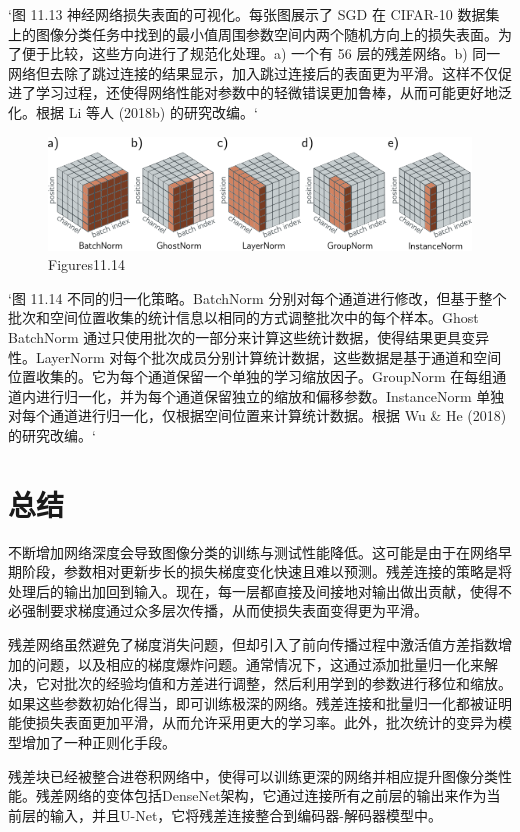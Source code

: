 `图 11.13 神经网络损失表面的可视化。每张图展示了 SGD 在 CIFAR-10 数据集上的图像分类任务中找到的最小值周围参数空间内两个随机方向上的损失表面。为了便于比较，这些方向进行了规范化处理。a) 一个有 56 层的残差网络。b) 同一网络但去除了跳过连接的结果显示，加入跳过连接后的表面更为平滑。这样不仅促进了学习过程，还使得网络性能对参数中的轻微错误更加鲁棒，从而可能更好地泛化。根据 Li 等人 (2018b) 的研究改编。`

\begin{figure}[h!]
\centering
\includegraphics[width=0.7\linewidth]{png/chapter11/ResidualNormTypes.png}
\caption{Figures11.14}
\end{figure}

`图 11.14 不同的归一化策略。BatchNorm 分别对每个通道进行修改，但基于整个批次和空间位置收集的统计信息以相同的方式调整批次中的每个样本。Ghost BatchNorm 通过只使用批次的一部分来计算这些统计数据，使得结果更具变异性。LayerNorm 对每个批次成员分别计算统计数据，这些数据是基于通道和空间位置收集的。它为每个通道保留一个单独的学习缩放因子。GroupNorm 在每组通道内进行归一化，并为每个通道保留独立的缩放和偏移参数。InstanceNorm 单独对每个通道进行归一化，仅根据空间位置来计算统计数据。根据 Wu & He (2018) 的研究改编。`

\section{总结}
不断增加网络深度会导致图像分类的训练与测试性能降低。这可能是由于在网络早期阶段，参数相对更新步长的损失梯度变化快速且难以预测。残差连接的策略是将处理后的输出加回到输入。现在，每一层都直接及间接地对输出做出贡献，使得不必强制要求梯度通过众多层次传播，从而使损失表面变得更为平滑。

残差网络虽然避免了梯度消失问题，但却引入了前向传播过程中激活值方差指数增加的问题，以及相应的梯度爆炸问题。通常情况下，这通过添加批量归一化来解决，它对批次的经验均值和方差进行调整，然后利用学到的参数进行移位和缩放。如果这些参数初始化得当，即可训练极深的网络。残差连接和批量归一化都被证明能使损失表面更加平滑，从而允许采用更大的学习率。此外，批次统计的变异为模型增加了一种正则化手段。

残差块已经被整合进卷积网络中，使得可以训练更深的网络并相应提升图像分类性能。残差网络的变体包括DenseNet架构，它通过连接所有之前层的输出来作为当前层的输入，并且U-Net，它将残差连接整合到编码器-解码器模型中。

